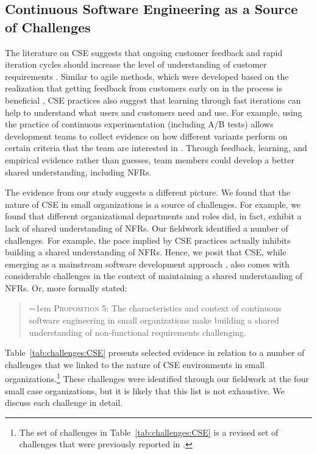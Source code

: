 \documentclass[smallextended]{svjour3}       %
\newcommand\cwproposition[2]{
\begin{quote}
\normalsize 
\vspace{0.5em}\hangindent=1em \textmd{\textsc{Proposition #1}: #2}\vspace{0.5em}
\end{quote}
}
\begin{document}
\subsection{Continuous Software Engineering as a Source of Challenges}

The literature on CSE suggests that ongoing customer feedback and rapid iteration cycles should increase the level of understanding of customer requirements \citep{bosch2014continuous,fitzgerald2017continuous,klotins2023continuous}. Similar to agile methods, which were developed based on the realization that getting feedback from customers early on in the process is beneficial \citep{williams2003agile}, CSE practices also suggest that learning through fast iterations can help to understand what users and customers need and use. For example, using the practice of continuous experimentation (including A/B tests) allows development teams to collect evidence on how different variants perform on certain criteria that the team are interested in \citep{quin2024b}. Through feedback, learning, and empirical evidence rather than guesses, team members could develop a better shared understanding, including NFRs.



The evidence from our study suggests a different picture. We found that the nature of CSE in small organizations is a source of challenges. For example, we found that different organizational departments and roles did, in fact, exhibit a lack of shared understanding of NFRs. 
Our fieldwork identified a number of challenges. For example, the pace implied by CSE practices actually inhibits building a shared understanding of NFRs. 
Hence, we posit that CSE, while emerging as a mainstream software development approach \citep{klotins2023continuous,bosch2014continuous}, also comes with considerable challenges in the context of maintaining a shared understanding of NFRs. Or, more formally stated:

\cwproposition{5}{The characteristics and context of continuous software engineering in small organizations make building a shared understanding of non-functional requirements challenging.} 




Table~\ref{tab:challenges:CSE} presents selected evidence in relation to a number of challenges that we linked to the nature of CSE environments in small organizations.\footnote{The set of challenges in Table~\ref{tab:challenges:CSE} is a revised set of challenges that were previously reported in  \cite{werner2020re,werner_tse_2021}.} These challenges were identified through our fieldwork at the four small case organizations, but it is likely that this list is not exhaustive. 
We discuss each challenge in detail.
\end{document}
